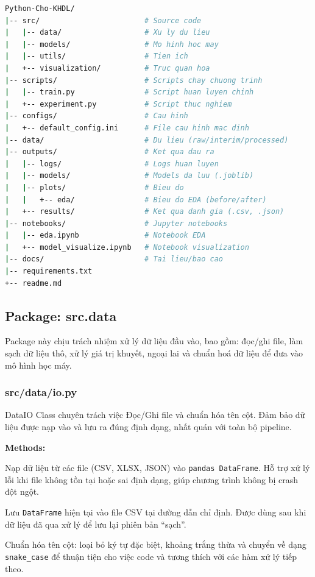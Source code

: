 \documentclass[12pt,a4paper]{article}
\newenvironment{methodlist}{
    \begin{description}[style=nextline, font=\ttfamily\color{sklearn-blue}]
}{
    \end{description}
}
\begin{document}
\begin{lstlisting}[language=bash]
Python-Cho-KHDL/
|-- src/                        # Source code
|   |-- data/                   # Xu ly du lieu
|   |-- models/                 # Mo hinh hoc may
|   |-- utils/                  # Tien ich
|   +-- visualization/          # Truc quan hoa
|-- scripts/                    # Scripts chay chuong trinh
|   |-- train.py                # Script huan luyen chinh
|   +-- experiment.py           # Script thuc nghiem
|-- configs/                    # Cau hinh
|   +-- default_config.ini      # File cau hinh mac dinh
|-- data/                       # Du lieu (raw/interim/processed)
|-- outputs/                    # Ket qua dau ra
|   |-- logs/                   # Logs huan luyen
|   |-- models/                 # Models da luu (.joblib)
|   |-- plots/                  # Bieu do
|   |   +-- eda/                # Bieu do EDA (before/after)
|   +-- results/                # Ket qua danh gia (.csv, .json)
|-- notebooks/                  # Jupyter notebooks
|   |-- eda.ipynb               # Notebook EDA
|   +-- model_visualize.ipynb   # Notebook visualization
|-- docs/                       # Tai lieu/bao cao
|-- requirements.txt
+-- readme.md
\end{lstlisting}

\subsection{Package: src.data}

Package này chịu trách nhiệm xử lý dữ liệu đầu vào, bao gồm: đọc/ghi file, làm sạch dữ liệu thô, xử lý giá trị khuyết, ngoại lai và chuẩn hoá dữ liệu để đưa vào mô hình học máy.

\subsubsection{src/data/io.py}

\begin{classbox}{DataIO}
Class chuyên trách việc Đọc/Ghi file và chuẩn hóa tên cột. 
Đảm bảo dữ liệu được nạp vào và lưu ra đúng định dạng, nhất quán với toàn bộ pipeline.

\vspace{0.2cm}
\textbf{Methods:}
\begin{methodlist}
    \item[load\_data(filepath)] 
    Nạp dữ liệu từ các file (CSV, XLSX, JSON) vào \texttt{pandas DataFrame}. 
    Hỗ trợ xử lý lỗi khi file không tồn tại hoặc sai định dạng, giúp chương trình không bị crash đột ngột.
    
    \item[save\_data(data, filepath)] 
    Lưu \texttt{DataFrame} hiện tại vào file CSV tại đường dẫn chỉ định. 
    Được dùng sau khi dữ liệu đã qua xử lý để lưu lại phiên bản ``sạch''.
    
    \item[clean\_column\_names(data)] 
    Chuẩn hóa tên cột: loại bỏ ký tự đặc biệt, khoảng trắng thừa và chuyển về dạng \texttt{snake\_case} để thuận tiện cho việc code và tương thích với các hàm xử lý tiếp theo.
\end{methodlist}
\end{classbox}
\end{document}
